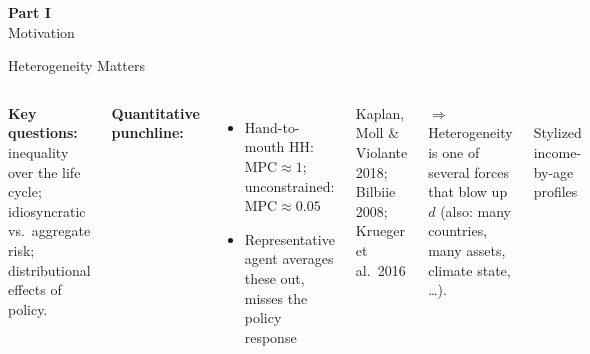 \documentclass[aspectratio=169,11pt]{beamer}
\newcommand{\emphc}[1]{\textcolor{harvardcrimson}{#1}}
\begin{document}
\begin{frame}{}
\vfill
\begin{center}
{\Huge \textcolor{uzhblue}{\textbf{Part I}}}\\[12pt]
{\LARGE Motivation}
\end{center}
\vfill
\end{frame}

\begin{frame}{Heterogeneity Matters}
\begin{columns}[T]
\small
\textbf{Key questions:} inequality over the life cycle; idiosyncratic vs.\ aggregate risk; distributional effects of policy.

\vspace{0.4em}
\textbf{Quantitative punchline:}
\begin{itemize}
    \setlength{\itemsep}{0pt}
    \item \emphc{Hand-to-mouth} HH: $\text{MPC}\!\approx\!1$; unconstrained: $\text{MPC}\!\approx\!0.05$
    \item Representative agent averages these out, misses the policy response
\end{itemize}
{\footnotesize Kaplan, Moll \& Violante 2018; Bilbiie 2008; Krueger et al.\ 2016}

\vspace{0.3em}
$\Rightarrow$ Heterogeneity is one of several forces that \emphc{blow up} $d$ (also: many countries, many assets, climate state, \ldots).

\begin{center}
\\
{\tiny Stylized income-by-age profiles}
\end{center}
\end{columns}
\end{frame}
\end{document}
